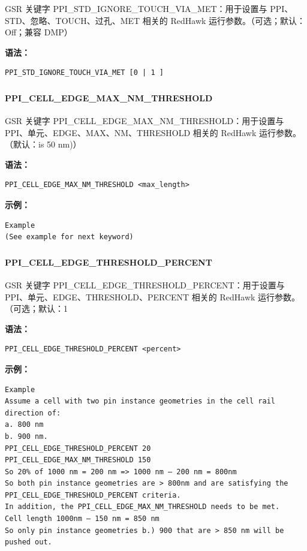 GSR 关键字 PPI_STD_IGNORE_TOUCH_VIA_MET：用于设置与 PPI、STD、忽略、TOUCH、过孔、MET 相关的 RedHawk 运行参数。（可选；默认：Off；兼容 DMP）

\textbf{语法：}
\begin{lstlisting}
PPI_STD_IGNORE_TOUCH_VIA_MET [0 | 1 ]
\end{lstlisting}

\subsubsection{}
\paragraph*{PPI_CELL_EDGE_MAX_NM_THRESHOLD}

GSR 关键字 PPI_CELL_EDGE_MAX_NM_THRESHOLD：用于设置与 PPI、单元、EDGE、MAX、NM、THRESHOLD 相关的 RedHawk 运行参数。（默认：is 50 nm)）

\textbf{语法：}
\begin{lstlisting}
PPI_CELL_EDGE_MAX_NM_THRESHOLD <max_length>
\end{lstlisting}

\textbf{示例：}
\begin{lstlisting}
Example
(See example for next keyword)
\end{lstlisting}

\subsubsection{}
\paragraph*{PPI_CELL_EDGE_THRESHOLD_PERCENT}

GSR 关键字 PPI_CELL_EDGE_THRESHOLD_PERCENT：用于设置与 PPI、单元、EDGE、THRESHOLD、PERCENT 相关的 RedHawk 运行参数。（可选；默认：1%

\textbf{语法：}
\begin{lstlisting}
PPI_CELL_EDGE_THRESHOLD_PERCENT <percent>
\end{lstlisting}

\textbf{示例：}
\begin{lstlisting}
Example
Assume a cell with two pin instance geometries in the cell rail direction of:
a. 800 nm
b. 900 nm.
PPI_CELL_EDGE_THRESHOLD_PERCENT 20
PPI_CELL_EDGE_MAX_NM_THRESHOLD 150
So 20% of 1000 nm = 200 nm => 1000 nm – 200 nm = 800nm
So both pin instance geometries are > 800nm and are satisfying the
PPI_CELL_EDGE_THRESHOLD_PERCENT criteria.
In addition, the PPI_CELL_EDGE_MAX_NM_THRESHOLD needs to be met.
Cell length 1000nm – 150 nm = 850 nm
So only pin instance geometries b.) 900 that are > 850 nm will be pushed out.
\end{lstlisting}

